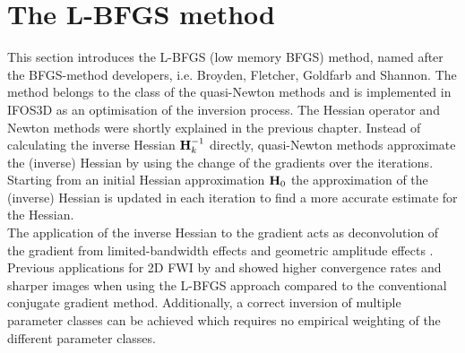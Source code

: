 \section{The L-BFGS method}\label{sec:lbfgs}
This section introduces the L-BFGS (low memory BFGS) method, named after the BFGS-method developers, i.e. Broyden, Fletcher, Goldfarb and Shannon. The method belongs to the class of the quasi-Newton methods and is implemented in IFOS3D as an optimisation of the inversion process. The Hessian operator and Newton methods were shortly explained in the previous chapter. Instead of calculating the inverse Hessian $\textbf H_k^{-1}$ directly, quasi-Newton methods approximate the (inverse) Hessian by using the change of the gradients over the iterations. Starting from an initial Hessian approximation $\textbf H_0$ the approximation of the (inverse) Hessian is updated in each iteration to find a more accurate estimate for the Hessian. \\
The application of the inverse Hessian to the gradient acts as deconvolution of the gradient from limited-bandwidth effects and geometric amplitude effects \citep{Pra98,Bro09}. Previous applications for 2D FWI by \cite{Bro09} and \cite{Bro11} showed higher convergence rates and sharper images when using the L-BFGS approach compared to the conventional conjugate gradient method. Additionally, a correct inversion of multiple parameter classes can be achieved which requires no empirical weighting of the different parameter classes.
